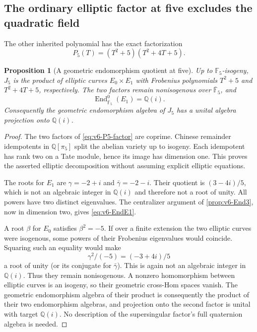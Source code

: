 \documentclass[11pt]{article}
\newtheorem{proposition}[proposition]{Proposition}
\theoremstyle{definition}
\theoremstyle{remark}
\newcommand{\F}{\mathbb F}
\newcommand{\Q}{\mathbb Q}
\newcommand{\End}{\operatorname{End}}
\begin{document}
\subsection{The ordinary elliptic factor at five excludes the quadratic field}
The other inherited polynomial has the exact factorization
\begin{equation}
 P_5(T)=(T^2+5)(T^2+4T+5).
 \label{eq:v6-P5-factor}
\end{equation}

\begin{proposition}[A geometric endomorphism quotient at five]
\label{prop:v6-End5}
Up to $\F_5$-isogeny, $J_5$ is the product of elliptic curves
$E_0\times E_1$ with Frobenius polynomials $T^2+5$ and
$T^2+4T+5$, respectively. The two factors remain nonisogenous over
$\overline{\F}_5$, and
\begin{equation}
 \boxed{\End^0_{\overline{\F}_5}(E_1)=\Q(i).}
 \label{eq:v6-EndE1}
\end{equation}
Consequently the geometric endomorphism algebra of $J_5$ has a unital
algebra projection onto $\Q(i)$.
\end{proposition}
\begin{proof}
The two factors of \eqref{eq:v6-P5-factor} are coprime. Chinese
remainder idempotents in $\Q[\pi_5]$ split the abelian variety up to
isogeny. Each idempotent has rank two on a Tate module, hence its image
has dimension one. This proves the asserted elliptic decomposition
without assuming explicit elliptic equations.

The roots for $E_1$ are $\gamma=-2+i$ and $\bar\gamma=-2-i$.
Their quotient is $(3-4i)/5$, which is not an algebraic integer in
$\Q(i)$ and therefore not a root of unity. All powers have two
 distinct eigenvalues. The centralizer argument of
\cref{prop:v6-End3}, now in dimension two, gives
\eqref{eq:v6-EndE1}.

A root $\beta$ for $E_0$ satisfies $\beta^2=-5$. If over a finite
extension the two elliptic curves were isogenous, some powers of their
Frobenius eigenvalues would coincide. Squaring such an equality would
make
\[
 \gamma^2/(-5)=(-3+4i)/5
\]
a root of unity (or its conjugate for $\bar\gamma$). This is again
not an algebraic integer in $\Q(i)$. Thus they remain nonisogenous.
A nonzero homomorphism between elliptic curves is an isogeny, so their
geometric cross-Hom spaces vanish. The geometric endomorphism algebra
of their product is consequently the product of their two endomorphism
algebras, and projection onto the second factor is unital with target
$\Q(i)$. No description of the supersingular factor's full quaternion
algebra is needed.
\end{proof}
\end{document}
